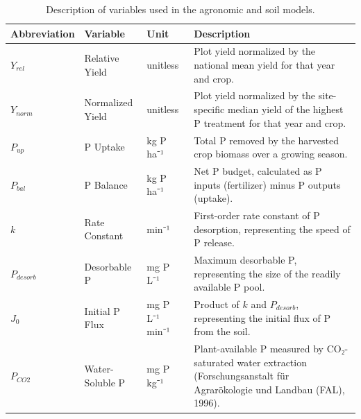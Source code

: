 \documentclass[
  a4paper,
]{article}
\begin{document}
\begin{longtable}[]{@{}
  >{\raggedright\arraybackslash}p{}
  >{\raggedright\arraybackslash}p{}
  >{\raggedright\arraybackslash}p{}
  >{\raggedright\arraybackslash}p{}@{}}

\caption{\label{tbl-variables}Description of variables used in the
agronomic and soil models.}

\tabularnewline

\toprule\noalign{}
\begin{minipage}[b]{\linewidth}\raggedright
Abbreviation
\end{minipage} & \begin{minipage}[b]{\linewidth}\raggedright
Variable
\end{minipage} & \begin{minipage}[b]{\linewidth}\raggedright
Unit
\end{minipage} & \begin{minipage}[b]{\linewidth}\raggedright
Description
\end{minipage} \\
\midrule\noalign{}
\endhead
\bottomrule\noalign{}
\endlastfoot
\(Y_{rel}\) & Relative Yield & unitless & Plot yield normalized by the
national mean yield for that year and crop. \\
\(Y_{norm}\) & Normalized Yield & unitless & Plot yield normalized by
the site-specific median yield of the highest P treatment for that year
and crop. \\
\(P_{up}\) & P Uptake & kg P ha⁻¹ & Total P removed by the harvested
crop biomass over a growing season. \\
\(P_{bal}\) & P Balance & kg P ha⁻¹ & Net P budget, calculated as P
inputs (fertilizer) minus P outputs (uptake). \\
\(k\) & Rate Constant & min⁻¹ & First-order rate constant of P
desorption, representing the speed of P release. \\
\(P_{desorb}\) & Desorbable P & mg P L⁻¹ & Maximum desorbable P,
representing the size of the readily available P pool. \\
\(J_0\) & Initial P Flux & mg P L⁻¹ min⁻¹ & Product of \(k\) and
\(P_{desorb}\), representing the initial flux of P from the soil. \\
\(P_{CO2}\) & Water-Soluble P & mg P kg⁻¹ & Plant-available P measured
by CO₂-saturated water extraction
(Forschungsanstalt für Agrarökologie und Landbau (FAL), 1996). \\

\end{longtable}
\end{document}
